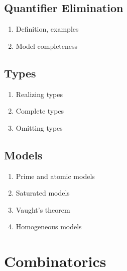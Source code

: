 \documentclass{article}
\begin{document}
\subsection{Quantifier Elimination} 
\begin{enumerate}
  \item Definition, examples
  \item Model completeness
\end{enumerate}

\subsection{Types} 
\begin{enumerate}
  \item Realizing types
  \item Complete types
  \item Omitting types
\end{enumerate}

\subsection{Models} 
\begin{enumerate}
  \item Prime and atomic models
  \item Saturated models
  \item Vaught's theorem
  \item Homogeneous models
\end{enumerate}

\section{Combinatorics}
\end{document}

